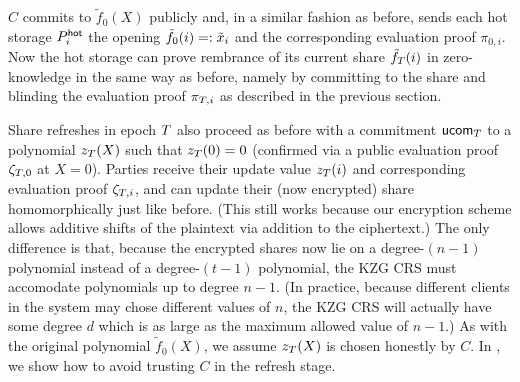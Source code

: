 $C$ commits to $\tilde{f}_0(X)$ publicly and, in a similar fashion as before, sends each hot storage $P_i^{\mathsf{hot}}$ the opening $\tilde{f}_0(i) =: \tilde{x}_i$ and the corresponding evaluation proof $\pi_{0,i}$. Now the hot storage can prove rembrance of its current share $\tilde{f}_{T}(i)$ in zero-knowledge in the same way as before, namely by committing to the share and blinding the evaluation proof $\pi_{T,i}$ as described in the previous section.

Share refreshes in epoch $T$ also proceed as before with a commitment $\mathsf{ucom}_{T}$ to a polynomial $z_{T}(X)$ such that $z_{T}(0) = 0$ (confirmed via a public evaluation proof $\zeta_{T,0}$ at $X=0$). Parties receive their update value $z_{T}(i)$ and corresponding evaluation proof $\zeta_{T,i}$, and can update their (now encrypted) share homomorphically just like before. (This still works because our encryption scheme allows additive shifts of the plaintext via addition to the ciphertext.) The only difference is that, because the encrypted shares now lie on a degree-$(n-1)$ polynomial instead of a degree-$(t-1)$ polynomial, the KZG CRS must accomodate polynomials up to degree $n-1$. (In practice, because different clients in the system may chose different values of $n$, the KZG CRS will actually have some degree $d$ which is as large as the maximum allowed value of $n-1$.) As with the original polynomial $\tilde{f}_0(X)$, we assume $z_{T}(X)$ is chosen honestly by $C$. In , we show how to avoid trusting $C$ in the refresh stage.

